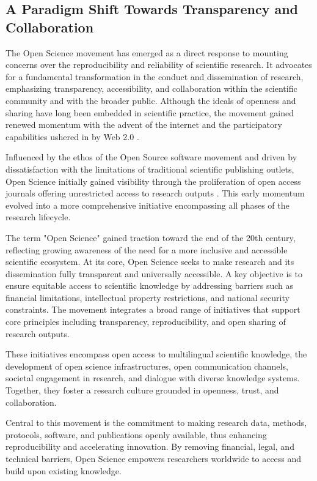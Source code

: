 \documentclass{article}
\begin{document}
\subsection{A Paradigm Shift Towards Transparency and Collaboration}

The Open Science movement has emerged as a direct response to mounting concerns over the reproducibility and reliability of scientific research. It advocates for a fundamental transformation in the conduct and dissemination of research, emphasizing transparency, accessibility, and collaboration within the scientific community and with the broader public. Although the ideals of openness and sharing have long been embedded in scientific practice, the movement gained renewed momentum with the advent of the internet and the participatory capabilities ushered in by Web 2.0 \cite{thibault_open_2023}.

Influenced by the ethos of the Open Source software movement and driven by dissatisfaction with the limitations of traditional scientific publishing outlets, Open Science initially gained visibility through the proliferation of open access journals offering unrestricted access to research outputs \cite{laakso_anatomy_2012}. This early momentum evolved into a more comprehensive initiative encompassing all phases of the research lifecycle.

The term "Open Science" gained traction toward the end of the 20th century, reflecting growing awareness of the need for a more inclusive and accessible scientific ecosystem. At its core, Open Science seeks to make research and its dissemination fully transparent and universally accessible. A key objective is to ensure equitable access to scientific knowledge by addressing barriers such as financial limitations, intellectual property restrictions, and national security constraints. The movement integrates a broad range of initiatives that support core principles including transparency, reproducibility, and open sharing of research outputs.

These initiatives encompass open access to multilingual scientific knowledge, the development of open science infrastructures, open communication channels, societal engagement in research, and dialogue with diverse knowledge systems. Together, they foster a research culture grounded in openness, trust, and collaboration.

Central to this movement is the commitment to making research data, methods, protocols, software, and publications openly available, thus enhancing reproducibility and accelerating innovation. By removing financial, legal, and technical barriers, Open Science empowers researchers worldwide to access and build upon existing knowledge.
\end{document}
